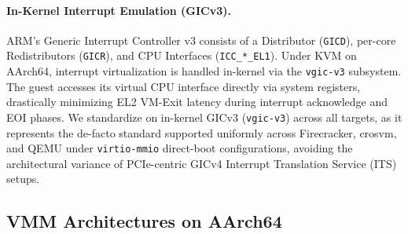 \documentclass{article}
\begin{document}
\paragraph{In-Kernel Interrupt Emulation (GICv3).}
ARM's Generic Interrupt Controller v3 consists of a Distributor (\texttt{GICD}), per-core Redistributors (\texttt{GICR}), and CPU Interfaces (\texttt{ICC\_*\_EL1}). Under KVM on AArch64, interrupt virtualization is handled in-kernel via the \texttt{vgic-v3} subsystem. The guest accesses its virtual CPU interface directly via system registers, drastically minimizing EL2 VM-Exit latency during interrupt acknowledge and EOI phases. We standardize on in-kernel GICv3 (\texttt{vgic-v3}) across all targets, as it represents the de-facto standard supported uniformly across Firecracker, crosvm, and QEMU under \texttt{virtio-mmio} direct-boot configurations, avoiding the architectural variance of PCIe-centric GICv4 Interrupt Translation Service (ITS) setups.

\subsection{VMM Architectures on AArch64}
\end{document}
